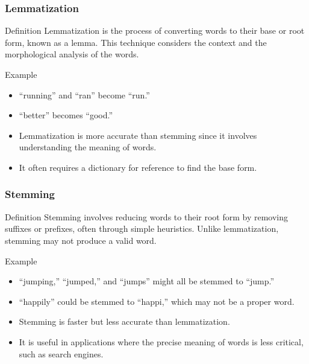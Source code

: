 \documentclass[aspectratio=169]{beamer}
\begin{document}
\begin{frame}[fragile]
    \frametitle{Lemmatization}
    \begin{block}{Definition}
        Lemmatization is the process of converting words to their base or root form, known as a lemma. This technique considers the context and the morphological analysis of the words.
    \end{block}

    \begin{block}{Example}
        \begin{itemize}
            \item “running” and “ran” become “run.”
            \item “better” becomes “good.”
        \end{itemize}
    \end{block}

    \begin{itemize}
        \item Lemmatization is more accurate than stemming since it involves understanding the meaning of words.
        \item It often requires a dictionary for reference to find the base form.
    \end{itemize}
\end{frame}

\begin{frame}[fragile]
    \frametitle{Stemming}
    \begin{block}{Definition}
        Stemming involves reducing words to their root form by removing suffixes or prefixes, often through simple heuristics. Unlike lemmatization, stemming may not produce a valid word.
    \end{block}

    \begin{block}{Example}
        \begin{itemize}
            \item “jumping,” “jumped,” and “jumps” might all be stemmed to “jump.”
            \item “happily” could be stemmed to “happi,” which may not be a proper word.
        \end{itemize}
    \end{block}

    \begin{itemize}
        \item Stemming is faster but less accurate than lemmatization.
        \item It is useful in applications where the precise meaning of words is less critical, such as search engines.
    \end{itemize}
\end{frame}
\end{document}

